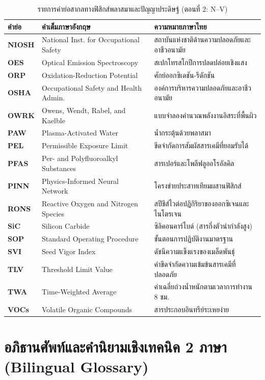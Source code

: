 \begin{table}[H]
\centering
\caption{รายการคำย่อสากลทางฟิสิกส์พลาสมาและปัญญาประดิษฐ์ (ตอนที่ 2: N--V)}
\label{tab:app_acronyms_part2}
\begin{tabularx}{\textwidth}{l l X}
\toprule
\textbf{คำย่อ} & \textbf{คำเต็มภาษาอังกฤษ} & \textbf{ความหมายภาษาไทย} \\
\midrule
\textbf{NIOSH} & National Inst. for Occupational Safety & สถาบันแห่งชาติด้านความปลอดภัยและอาชีวอนามัย \\
\textbf{OES} & Optical Emission Spectroscopy & สเปกโทรสโกปีการปลดปล่อยเชิงแสง \\
\textbf{ORP} & Oxidation-Reduction Potential & ศักย์ออกซิเดชัน-รีดักชัน \\
\textbf{OSHA} & Occupational Safety and Health Admin. & องค์การบริหารความปลอดภัยและอาชีวอนามัย \\
\textbf{OWRK} & Owens, Wendt, Rabel, and Kaelble & แบบจำลองคำนวณพลังงานอิสระที่พื้นผิว \\
\textbf{PAW} & Plasma-Activated Water & น้ำกระตุ้นด้วยพลาสมา \\
\textbf{PEL} & Permissible Exposure Limit & ขีดจำกัดการสัมผัสสารเคมีที่ยอมรับได้ \\
\textbf{PFAS} & Per- and Polyfluoroalkyl Substances & สารเปอร์และโพลีฟลูออโรอัลคิล \\
\textbf{PINN} & Physics-Informed Neural Network & โครงข่ายประสาทเทียมผสานฟิสิกส์ \\
\textbf{RONS} & Reactive Oxygen and Nitrogen Species & สปีชีส์ไวต่อปฏิกิริยาของออกซิเจนและไนโตรเจน \\
\textbf{SiC} & Silicon Carbide & ซิลิคอนคาร์ไบด์ (สารกึ่งตัวนำกำลังสูง) \\
\textbf{SOP} & Standard Operating Procedure & ขั้นตอนการปฏิบัติงานมาตรฐาน \\
\textbf{SVI} & Seed Vigor Index & ดัชนีความแข็งแรงของเมล็ดพันธุ์ \\
\textbf{TLV} & Threshold Limit Value & ค่าขีดจำกัดความเข้มข้นสารเคมีที่ปลอดภัย \\
\textbf{TWA} & Time-Weighted Average & ค่าเฉลี่ยถ่วงน้ำหนักตามเวลาการทำงาน 8 ชม. \\
\textbf{VOCs} & Volatile Organic Compounds & สารประกอบอินทรีย์ระเหยง่าย \\
\bottomrule
\end{tabularx}
\end{table}

\section{อภิธานศัพท์และคำนิยามเชิงเทคนิค 2 ภาษา (Bilingual Glossary)}
\label{app:sec_glossary}

